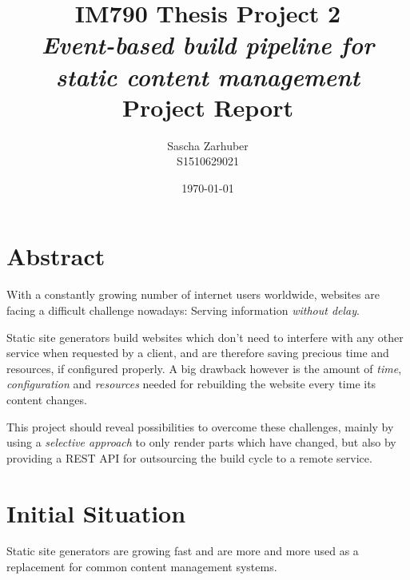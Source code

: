 \documentclass[a4paper,english,11pt]{report}
\author{Sascha Zarhuber\\ S1510629021}
\title{IM790 Thesis Project 2\\ \emph{Event-based build pipeline for static content management}\\ Project Report}
\date{\today}
\begin{document}
\maketitle
\tableofcontents

\chapter*{Abstract} %

With a constantly growing number of internet users worldwide, websites are facing a difficult challenge nowadays: Serving information \emph{without delay}.

Static site generators build websites which don't need to interfere with any other service when requested by a client, and are therefore saving precious time and resources, if configured properly. A big drawback however is the amount of \emph{time}, \emph{configuration} and \emph{resources} needed for rebuilding the website every time its content changes.

This project should reveal possibilities to overcome these challenges, mainly by using a \emph{selective approach} to only render parts which have changed, but also by providing a REST API for outsourcing the build cycle to a remote service.


\chapter{Initial Situation}

Static site generators are growing fast and are more and more used as a replacement for common content management systems.
\end{document}
